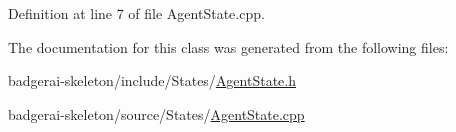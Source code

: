 Definition at line 7 of file Agent\-State.\-cpp.


\begin{DoxyCode}
{
}
\end{DoxyCode}


The documentation for this class was generated from the following files\-:\begin{DoxyCompactItemize}
\item 
badgerai-\/skeleton/include/\-States/\hyperlink{AgentState_8h}{Agent\-State.\-h}\item 
badgerai-\/skeleton/source/\-States/\hyperlink{AgentState_8cpp}{Agent\-State.\-cpp}\end{DoxyCompactItemize}

